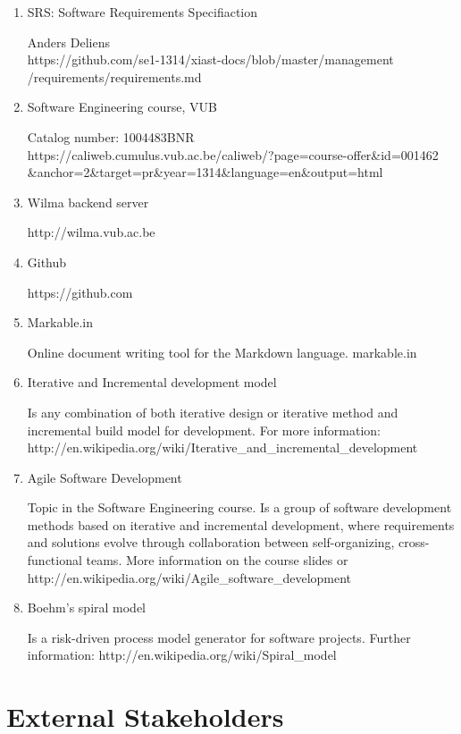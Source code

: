 \documentclass[12pt]{article}
\begin{document}
\begin{enumerate}
\def\labelenumi{\arabic{enumi}.}
\item
  SRS: Software Requirements Specifiaction

  Anders Deliens\\
  https://github.com/se1-1314/xiast-docs/blob/master/management\\
  /requirements/requirements.md
\item
  Software Engineering course, VUB

  Catalog number: 1004483BNR\\
  https://caliweb.cumulus.vub.ac.be/caliweb/?page=course-offer\&id=001462\\
  \&anchor=2\&target=pr\&year=1314\&language=en\&output=html
\item
  Wilma backend server

  http://wilma.vub.ac.be
\item
  Github

  https://github.com
\item
  Markable.in

  Online document writing tool for the Markdown language.
  markable.in
\item
  Iterative and Incremental development model

  Is any combination of both iterative design or iterative method and
  incremental build model for development. For more information:\\
  http://en.wikipedia.org/wiki/Iterative\_and\_incremental\_development
\item
  Agile Software Development

  Topic in the Software Engineering course. Is a group of software
  development methods based on iterative
  and incremental development, where requirements and solutions evolve
  through collaboration between self-organizing, cross-functional teams.
  More information on the course slides or
  http://en.wikipedia.org/wiki/Agile\_software\_development
\item
  Boehm's spiral model

  Is a risk-driven process model generator for software projects.
  Further information: http://en.wikipedia.org/wiki/Spiral\_model
\end{enumerate}

\section{External Stakeholders}\label{external-stakeholders}
\end{document}
